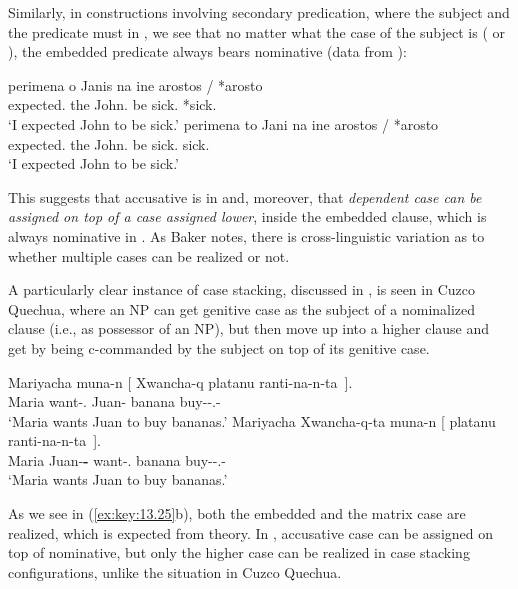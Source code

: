 \documentclass[output=paper]{langsci/langscibook}
\begin{document}
Similarly, in constructions involving secondary predication, where the subject
and the predicate must  in , we see that no matter what
the case of the subject is (\Nom{} or \Acc), the embedded predicate always
bears nominative (data from \citealt{KotzPapa2007}):

\ea%
\label{ex:key:13.24} \parencite{KotzPapa2007}
	\ea
	\gll  perimena o Janis na ine arostos / *arosto\\
        expected.\Fsg{} the John.\Nom{} \Sbjv{} be sick.\Nom{} {} \hphantom{*}*sick.\Acc{}\\
	\glt     ‘I expected John to be sick.’
	\ex
	\gll  perimena to Jani na ine arostos / *arosto\\
        expected.\Fsg{} the John.\Acc{} \Sbjv{} be sick.\Nom{} {} \hphantom{*}sick.\Acc{}\\
	\glt     ‘I expected John to be sick.’
    \z
\z

This suggests that accusative is  in  and, moreover, that
\emph{dependent case can be assigned on top of a case assigned lower}, inside
the embedded clause, which is always nominative in .  As Baker notes,
there is cross-linguistic variation as to whether multiple cases can be
realized or not.

A particularly clear instance of case stacking, discussed in \citet{Baker2015},
is seen in Cuzco Quechua, where an NP can get genitive case
as the subject of a nominalized clause (i.e., as possessor of an NP), but then
move up into a higher clause and get  by being c-commanded
by the subject on top of its genitive case.

\ea%
\label{ex:key:13.25} \parencite[116]{Baker2015}
	\ea
	\gll  Mariyacha muna-n  [ Xwancha-q platanu ranti-na-n-ta~].\\
        Maria want-\Third.\Sbj{} {} Juan-\textbf{\Gen{}}  banana buy-\Nmlz{}-\Third.\Poss{}-\Acc{}\\
	\glt     ‘Maria wants Juan to buy bananas.’
	\ex
	\gll  Mariyacha  Xwancha-q-ta muna-n [ platanu ranti-na-n-ta~].\\
        Maria    Juan-\textbf{\Gen{}-\Acc{}} want-\Third.\Sbj{} {} banana buy-\Nmlz{}-\Third.\Poss{}-\Acc{}\\
	\glt     ‘Maria wants Juan to buy bananas.’
    \z
\z

As we see in (\ref{ex:key:13.25}b), both the embedded and the matrix case are
realized, which is expected from  theory. In ,
accusative case can be assigned on top of nominative, but
only the higher case can be realized in case stacking configurations, unlike
the situation in Cuzco Quechua.
\end{document}

